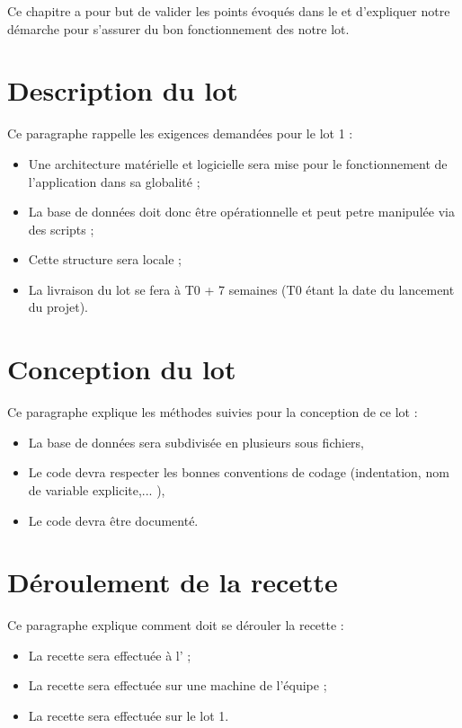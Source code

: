 	Ce chapitre a pour but de valider les points évoqués dans le \DSE{} et d'expliquer notre démarche pour s'assurer du bon fonctionnement des notre lot.
	
\section{Description du lot}
	Ce paragraphe rappelle les exigences demandées pour le lot 1 :
	\begin{itemize}
		\item Une architecture matérielle et logicielle sera mise pour le fonctionnement de l'application dans sa globalité ;
		\item La base de données doit donc être opérationnelle et peut petre manipulée via des scripts ;
		\item Cette structure sera locale ;
		\item La livraison du lot se fera à T0 + 7 semaines (T0 étant la date du lancement du projet).
	\end{itemize}
	
\section{Conception du lot}
	Ce paragraphe explique les méthodes suivies pour la conception de ce lot :
	\begin{itemize}
		\item La base de données sera subdivisée en plusieurs sous fichiers,
		\item Le code devra respecter les bonnes conventions de codage (indentation, nom de variable explicite,... ),
		\item Le code devra être documenté.
	\end{itemize}
	
\section{Déroulement de la recette}
	Ce paragraphe explique comment doit se dérouler la recette : 
	\begin{itemize}
		\item La recette sera effectuée à l'\INSA{} ;
		\item La recette sera effectuée sur une machine de l'équipe \nomEquipe{} ;
		\item La recette sera effectuée sur le lot 1.
	\end{itemize}

